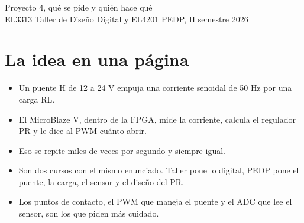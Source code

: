 \documentclass[11pt,a4paper]{article}
\begin{document}
\begin{center}
{\LARGE Proyecto 4, qué se pide y quién hace qué}\\[3pt]
\small EL3313 Taller de Diseño Digital y EL4201 PEDP, II semestre 2026
\end{center}

\section{La idea en una página}

\begin{itemize}
\item Un puente H de 12 a 24 V empuja una corriente senoidal de 50 Hz por una carga RL.
\item El MicroBlaze V, dentro de la FPGA, mide la corriente, calcula el regulador PR y le dice al PWM cuánto abrir.
\item Eso se repite miles de veces por segundo y siempre igual.
\item Son dos cursos con el mismo enunciado. Taller pone lo digital, PEDP pone el puente, la carga, el sensor y el diseño del PR.
\item Los puntos de contacto, el PWM que maneja el puente y el ADC que lee el sensor, son los que piden más cuidado.
\end{itemize}
\end{document}
